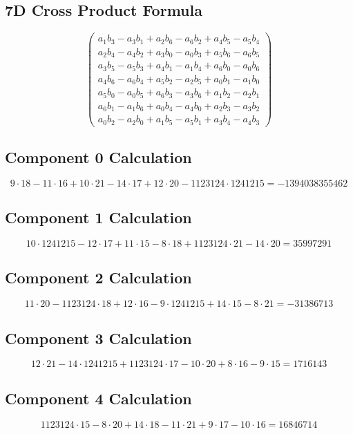 \documentclass{article}
\begin{document}
\subsection*{ \vspace{1em} 7D Cross Product Formula}
\[
\begin{pmatrix}
        a_1b_3 - a_3b_1 + a_2b_6 - a_6b_2 + a_4b_5 - a_5b_4 \\
        a_2b_4 - a_4b_2 + a_3b_0 - a_0b_3 + a_5b_6 - a_6b_5 \\
        a_3b_5 - a_5b_3 + a_4b_1 - a_1b_4 + a_6b_0 - a_0b_6 \\
        a_4b_6 - a_6b_4 + a_5b_2 - a_2b_5 + a_0b_1 - a_1b_0 \\
        a_5b_0 - a_0b_5 + a_6b_3 - a_3b_6 + a_1b_2 - a_2b_1 \\
        a_6b_1 - a_1b_6 + a_0b_4 - a_4b_0 + a_2b_3 - a_3b_2 \\
        a_0b_2 - a_2b_0 + a_1b_5 - a_5b_1 + a_3b_4 - a_4b_3
        \end{pmatrix}
\]
\subsection*{ \vspace{1em} Component 0 Calculation}
\[
9 \cdot 18 - 11 \cdot 16 + 10 \cdot 21 - 14 \cdot 17 + 12 \cdot 20 - 1123124 \cdot 1241215 = -1394038355462
\]
\subsection*{ \vspace{1em} Component 1 Calculation}
\[
10 \cdot 1241215 - 12 \cdot 17 + 11 \cdot 15 - 8 \cdot 18 + 1123124 \cdot 21 - 14 \cdot 20 = 35997291
\]
\subsection*{ \vspace{1em} Component 2 Calculation}
\[
11 \cdot 20 - 1123124 \cdot 18 + 12 \cdot 16 - 9 \cdot 1241215 + 14 \cdot 15 - 8 \cdot 21 = -31386713
\]
\subsection*{ \vspace{1em} Component 3 Calculation}
\[
12 \cdot 21 - 14 \cdot 1241215 + 1123124 \cdot 17 - 10 \cdot 20 + 8 \cdot 16 - 9 \cdot 15 = 1716143
\]
\subsection*{ \vspace{1em} Component 4 Calculation}
\[
1123124 \cdot 15 - 8 \cdot 20 + 14 \cdot 18 - 11 \cdot 21 + 9 \cdot 17 - 10 \cdot 16 = 16846714
\]
\end{document}

